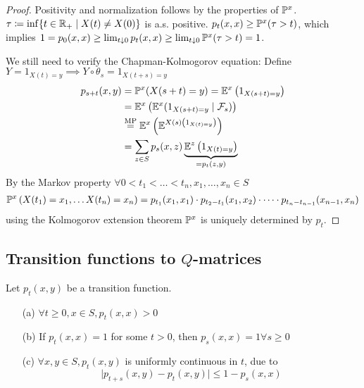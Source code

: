 \begin{proof}
     Positivity and normalization follows by the properties of \(\mathbb{P}^x\).
    \(\tau\coloneqq \inf\{t\in\mathbb{R}_+\mid X(t)\neq X(0)\}\) is a.s. positive. \(p_t(x,x)\geq \mathbb{P}^x(\tau>t)\), which 
    implies \(1=p_0(x,x)\geq \lim_{t\downarrow 0}p_t(x,x)\geq \lim_{t\downarrow 0}\mathbb{P}^x(\tau >t)=1\). 
    
    We still need to verify the Chapman-Kolmogorov equation:
    Define \(Y=1_{X(t)=y}\implies Y\circ \theta_s=1_{X(t+s)=y}\) 
    \begin{align*}
        p_{s+t}(x,y) &=\mathbb{P}^x(X(s+t)=y)=\mathbb{E}^x\left(1_{X(s+t)=y}\right)\\
        &=\mathbb{E}^x\left(\mathbb{E}^x(1_{X(s+t)=y}\mid \mathcal{F}_s)\right)\\
        &\stackrel{\text{MP}}{=}\mathbb{E}^x\left(\mathbb{E}^{X(s)\left(1_{X(t)=y}\right)}\right)\\
        &=\sum_{z\in S}p_s(x,z)\underbrace{\mathbb{E}^z\left(1_{X(t)=y}\right)}_{=p_t(z,y)}
    \end{align*}
     By the Markov property \(\forall 0<t_1<\dots<t_n,x_1,\dots,x_n\in S\)
    \begin{align*}
        \mathbb{P}^x\left(X(t_1)=x_1,\dots X(t_n)=x_n\right)=p_{t_1}(x_1,x_1)\cdot p_{t_2-t_1}(x_1,x_2)\cdot \dots\cdot p_{t_n-t_{n-1}}(x_{n-1},x_{n})
    \end{align*}
    using the Kolmogorov extension theorem  \(\mathbb{P}^x\) is uniquely determined by \(p_t\).
\end{proof}

\subsection{Transition functions to \(Q\)-matrices}

\begin{proposition}\label{prop:1.6}
    Let \(p_t(x,y)\) be a transition function.
    \begin{enumerate}
        \item[(a)] \(\forall t\geq 0,x\in S,p_t(x,x)>0\)
        \item[(b)] If \(p_t(x,x)=1\) for some \(t>0\), then \(p_s(x,x)=1\forall s\geq 0\)
        \item[(c)] \(\forall x,y\in S, p_t(x,y)\) is uniformly continuous in \(t\), due to 
        \[\vert p_{t+s}(x,y)-p_t(x,y)\vert\leq 1-p_{s}(x,x)\]
    \end{enumerate}
\end{proposition}

